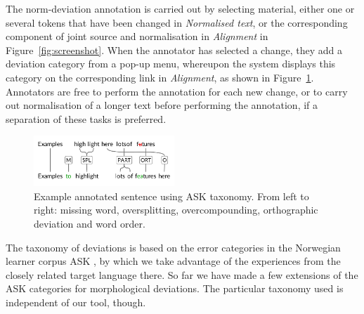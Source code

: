 \documentclass[10pt, a4paper]{article}
\newcommand{\mats}[1]{{\color{Blue}{Mats: #1}}}
\begin{document}
The norm-deviation annotation is carried out by selecting material, either
one or several tokens that have been changed in {\em Normalised text},
or the corresponding component of joint source and normalisation in {\em Alignment} in Figure~\ref{fig:screenshot}.
When the annotator has selected a change, they add a deviation
category from a pop-up menu, whereupon the system displays this category on the
corresponding link in {\em Alignment}, as shown in Figure~\ref{fig:normann}.
Annotators are free to perform the annotation for each new change, or to carry out normalisation of a longer text before performing the annotation, if a separation of these tasks is preferred.


\begin{figure}[t] %
\includegraphics[height=1.9cm, trim={-0.5cm 0.55cm 0 0.1cm}, clip]{features7.pdf}
\caption{Example annotated sentence using ASK taxonomy. From left to right:
missing word, oversplitting, overcompounding, orthographic deviation and
word order.
\label{fig:normann}}
\end{figure}

The taxonomy of deviations is based on the error categories in the Norwegian
learner corpus ASK \cite{tenfjord2006ask}, by which we take advantage of the experiences from the closely related target language there. So far we have made a few extensions of the ASK categories for morphological deviations. The particular taxonomy used is independent of our tool, though.


\end{document}
